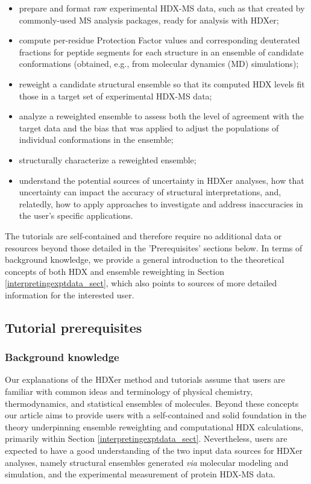 \documentclass[9pt,tutorial,ASAPversion]{livecoms}
\begin{document}
\begin{itemize}
\item prepare and format raw experimental HDX-MS data, such as that created by commonly-used MS analysis packages, ready for analysis with HDXer;
\item compute per-residue Protection Factor values and corresponding deuterated fractions for peptide segments for each structure in an ensemble of candidate conformations (obtained, e.g., from molecular dynamics (MD) simulations); 
\item reweight a candidate structural ensemble so that its computed HDX levels fit those in a target set of experimental HDX-MS data; 
\item analyze a reweighted ensemble to assess both the level of agreement with the target data and the bias that was applied to adjust the populations of individual conformations in the ensemble;
\item structurally characterize a reweighted ensemble;
\item understand the potential sources of uncertainty in HDXer analyses, how that uncertainty can impact the accuracy of structural interpretations, and, relatedly, how to apply approaches to investigate and address inaccuracies in the user's specific applications.
\end{itemize} 

The tutorials are self-contained and therefore require no additional data or resources beyond those detailed in the 'Prerequisites' sections below. 
In terms of background knowledge, we provide a general introduction to the theoretical concepts of both HDX and ensemble reweighting in Section \ref{interpretingexptdata_sect}, which also points to sources of more detailed information for the interested user.

\subsection{Tutorial prerequisites}
\subsubsection{Background knowledge}
Our explanations of the HDXer method and tutorials assume that users are familiar with common ideas and terminology of physical chemistry, thermodynamics, and statistical ensembles of molecules.
Beyond these concepts our article aims to provide users with a self-contained and solid foundation in the theory underpinning ensemble reweighting and computational HDX calculations, primarily within Section \ref{interpretingexptdata_sect}. 
Nevertheless, users are expected to have a good understanding of the two input data sources for HDXer analyses, namely structural ensembles generated \textit{via} molecular modeling and simulation, and the experimental measurement of protein HDX-MS data. 
\end{document}
